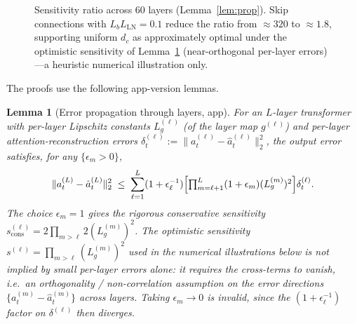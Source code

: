 \documentclass[11pt]{article}
\theoremstyle{plain}
\newtheorem{lemma}[theorem]{Lemma}
\theoremstyle{definition}
\theoremstyle{remark}
\begin{document}
\begin{figure}[t]
\centering
{}
\caption{Sensitivity ratio across 60 layers
(Lemma~\ref{lem:prop}). Skip connections with
$L_b L_{\mathrm{LN}} = 0.1$ reduce the ratio from $\approx 320$
to $\approx 1.8$, supporting uniform $d_c$ as approximately optimal
under the optimistic sensitivity of Lemma~\ref{lem:error-prop-app}
(near-orthogonal per-layer errors)---a heuristic numerical
illustration only.}
\label{fig:sensitivity}
\end{figure}

The proofs use the following app-version lemmas.

\begin{lemma}[Error propagation through layers, app]\label{lem:error-prop-app}
For an $L$-layer transformer with per-layer Lipschitz constants
$L_g^{(\ell)}$ (of the layer map $g^{(\ell)}$) and per-layer
attention-reconstruction errors
$\delta_t^{(\ell)} := \|a_t^{(\ell)} - \hat a_t^{(\ell)}\|_2^2$, the
output error satisfies, for any $\{\epsilon_m > 0\}$,
\[
\|a_t^{(L)} - \hat a_t^{(L)}\|_2^2
\;\leq\;
\sum_{\ell=1}^L (1+\epsilon_\ell^{-1})
\Bigl[\textstyle\prod_{m=\ell+1}^L (1+\epsilon_m)(L_g^{(m)})^2\Bigr]
\delta_t^{(\ell)}.
\]
The choice $\epsilon_m = 1$ gives the \emph{rigorous conservative}
sensitivity
$s^{(\ell)}_{\mathrm{cons}} = 2\prod_{m>\ell} 2(L_g^{(m)})^2$. The
\emph{optimistic} sensitivity $s^{(\ell)} = \prod_{m>\ell}(L_g^{(m)})^2$
used in the numerical illustrations below is \emph{not} implied by
small per-layer errors alone: it requires the cross-terms to vanish,
i.e.\ an orthogonality / non-correlation assumption on the error
directions $\{a_t^{(m)}-\hat a_t^{(m)}\}$ across layers. Taking
$\epsilon_m\to0$ is invalid, since the $(1+\epsilon_\ell^{-1})$ factor
on $\delta^{(\ell)}$ then diverges.
\end{lemma}
\end{document}
